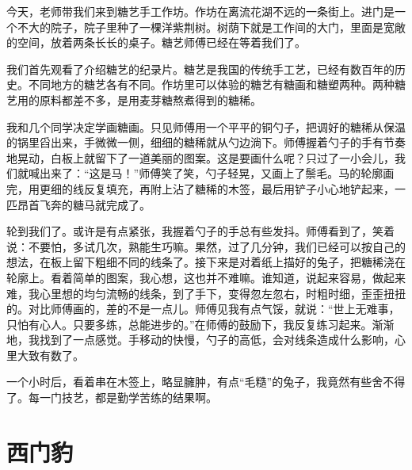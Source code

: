 \documentclass[12pt,UTF-8,openany]{ctexbook}
\begin{document}
\begin{large}
    
    今天，老师带我们来到糖艺手工作坊。作坊在离流花湖不远的一条街上。进门是一个不大的院子，院子里种了一棵洋紫荆树。树荫下就是工作间的大门，里面是宽敞的空间，放着两条长长的桌子。糖艺师傅已经在等着我们了。
    
    我们首先观看了介绍糖艺的纪录片。糖艺是我国的传统手工艺，已经有数百年的历史。不同地方的糖艺各有不同。作坊里可以体验的糖艺有糖画和糖塑两种。两种糖艺用的原料都差不多，是用麦芽糖熬煮得到的糖稀。
    
    我和几个同学决定学画糖画。只见师傅用一个平平的铜勺子，把调好的糖稀从保温的锅里舀出来，手微微一侧，细细的糖稀就从勺边淌下。师傅握着勺子的手有节奏地晃动，白板上就留下了一道美丽的图案。这是要画什么呢？只过了一小会儿，我们就喊出来了：“这是马！”师傅笑了笑，勺子轻晃，又画上了鬃毛。马的轮廓画完，用更细的线反复填充，再附上沾了糖稀的木签，最后用铲子小心地铲起来，一匹昂首飞奔的糖马就完成了。
    
    轮到我们了。或许是有点紧张，我握着勺子的手总有些发抖。师傅看到了，笑着说：不要怕，多试几次，熟能生巧嘛。果然，过了几分钟，我们已经可以按自己的想法，在板上留下粗细不同的线条了。接下来是对着纸上描好的兔子，把糖稀浇在轮廓上。看着简单的图案，我心想，这也并不难嘛。谁知道，说起来容易，做起来难，我心里想的均匀流畅的线条，到了手下，变得忽左忽右，时粗时细，歪歪扭扭的。对比师傅画的，差的不是一点儿。师傅见我有点气馁，就说：“世上无难事，只怕有心人。只要多练，总能进步的。”在师傅的鼓励下，我反复练习起来。渐渐地，我找到了一点感觉。手移动的快慢，勺子的高低，会对线条造成什么影响，心里大致有数了。
    
    一个小时后，看着串在木签上，略显臃肿，有点“毛糙”的兔子，我竟然有些舍不得了。每一门技艺，都是勤学苦练的结果啊。
    
\end{large}



\chapter{西门豹}
\end{document}
